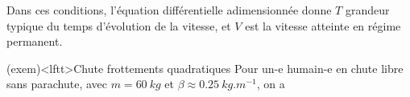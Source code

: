 \documentclass[../../main/main.tex]{subfiles}
\begin{document}
\begin{tcb*}
\begin{isd}
{		}%
		\vspace{-15pt}
		\tcblower
		\vspace{-15pt}
	\end{isd}
	Dans ces conditions, l'équation différentielle adimensionnée donne $T$ grandeur
	typique du temps d'évolution de la vitesse, et $V$ est la vitesse atteinte en
	régime permanent.
	\begin{center}
		\vspace{-15pt}
	\end{center}
\end{tcb*}

\begin{tcb}(exem)<lftt>{Chute frottements quadratiques}
	Pour un-e humain-e en chute libre sans parachute, avec $m = \SI{60}{kg}$ et
	$\beta \approx \SI{0.25}{kg.m^{-1}}$, on a
	\psw{%
		\[
			\boxed{v_{\lim} = \SI{50}{m.s^{-1} \approx \SI{175}{km.h^{-1}}}}
			\qet
			\boxed{T \approx \SI{5}{s}}
		\]
	}%
	\vspace{-25pt}
\end{tcb}
\end{document}

